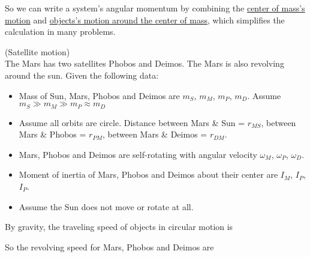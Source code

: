 \documentclass[class=article, crop=false, 12pt]{standalone}
\begin{document}
So we can write a system's angular momentum by combining the \ul{center of mass's motion} 
and \ul{objects's motion around the center of mass},
which simplifies the calculation in many problems.\\

\begin{example}
    (Satellite motion)\\

    The Mars has two satellites Phobos and Deimos. The Mars is also revolving around the sun.
    Given the following data:
    \begin{itemize}
        \item Mass of Sun, Mars, Phobos and Deimos are $m_S$, $m_M$, $m_P$, $m_D$. Assume $m_S\gg m_M\gg m_P\approx m_D$
        \item Assume all orbits are circle. 
            Distance between Mars \& Sun = $r_{MS}$, between Mars \& Phobos = $r_{PM}$, between Mars \& Deimos = $r_{DM}$.
        \item Mars, Phobos and Deimos are self-rotating with angular velocity $\omega_M$, $\omega_P$, $\omega_D$.
        \item Moment of inertia of Mars, Phobos and Deimos about their center are $I_M$, $I_P$, $I_P$.
        \item Assume the Sun does not move or rotate at all.
    \end{itemize}
    

    By gravity, the traveling speed of objects in circular motion is

    So the revolving speed for Mars, Phobos and Deimos are 


\end{example}
\end{document}

